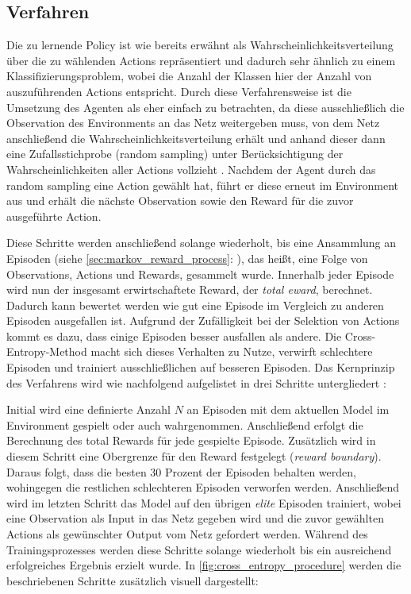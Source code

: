\documentclass[11pt]{scrartcl}
\begin{document}
\subsection{Verfahren}
Die zu lernende Policy ist wie bereits erwähnt als Wahrscheinlichkeitsverteilung über die 
zu wählenden Actions repräsentiert und dadurch sehr ähnlich zu einem Klassifizierungsproblem,
wobei die Anzahl der Klassen hier der Anzahl von auszuführenden Actions entspricht. Durch
diese Verfahrensweise ist die Umsetzung des Agenten als eher einfach zu betrachten, da
diese ausschließlich die Observation des Environments an das Netz weitergeben muss, von
dem Netz anschließend die Wahrscheinlichkeitsverteilung erhält und anhand dieser dann eine
Zufallsstichprobe (random sampling) unter Berücksichtigung der Wahrscheinlichkeiten aller
Actions vollzieht \cite[~S.78]{L2018}. Nachdem der Agent durch das random sampling eine
Action gewählt hat, führt er diese erneut im Environment aus und erhält die nächste
Observation sowie den Reward für die zuvor ausgeführte Action.

Diese Schritte werden anschließend solange wiederholt, bis eine Ansammlung an Episoden (siehe 
\autoref{sec:markov_reward_process}: ), das heißt, eine Folge
von Observations, Actions und Rewards, gesammelt wurde. Innerhalb jeder Episode wird nun der
insgesamt erwirtschaftete Reward, der \textit{total eward}, berechnet. Dadurch kann bewertet werden
wie gut eine Episode im Vergleich zu anderen Episoden ausgefallen ist. Aufgrund der Zufälligkeit
bei der Selektion von Actions kommt es dazu, dass einige Episoden besser ausfallen als andere.
Die Cross-Entropy-Method macht sich dieses Verhalten zu Nutze, verwirft schlechtere Episoden und
trainiert ausschließlichen auf besseren Episoden. Das Kernprinzip des Verfahrens wird wie nachfolgend
aufgelistet in drei Schritte untergliedert \cite[~S.80 f.]{L2018}:

Initial wird eine definierte Anzahl $N$ an Episoden mit dem aktuellen Model im Environment gespielt
oder auch wahrgenommen. Anschließend erfolgt die Berechnung des total Rewards für jede gespielte
Episode. Zusätzlich wird in diesem Schritt eine Obergrenze für den Reward festgelegt 
(\textit{reward boundary}). Daraus folgt, dass die besten 30 Prozent der Episoden behalten werden,
wohingegen die restlichen schlechteren Episoden verworfen werden. Anschließend wird im letzten Schritt
das Model auf den übrigen \textit{elite} Episoden trainiert, wobei eine Observation als Input in das
Netz gegeben wird und die zuvor gewählten Actions als gewünschter Output vom Netz gefordert werden.
Während des Trainingsprozesses werden diese Schritte solange wiederholt bis ein ausreichend
erfolgreiches Ergebnis erzielt wurde. In \autoref{fig:cross_entropy_procedure} werden die
beschriebenen Schritte zusätzlich visuell dargestellt:
\end{document}
